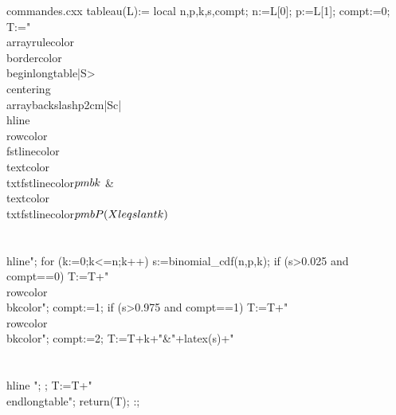 \usepackage[table]{xcolor}
\usepackage{amsmath,amssymb}
\usepackage{fancyvrb}
\usepackage{cellspace}
\setlength{\cellspacetoplimit}{3pt}
\setlength{\cellspacebottomlimit}{3pt}
\usepackage{longtable}
\def\bkcolor{gray!10}
\def\fstlinecolor{gray}
\def\txtfstlinecolor{white}
\def\bordercolor{black}

\begin{VerbatimOut}{commandes.cxx}
tableau(L):={
 local n,p,k,s,compt;
 n:=L[0];
 p:=L[1];
 compt:=0;
 T:="\\arrayrulecolor{\\bordercolor}\\begin{longtable}{|S{>{\\centering\\arraybackslash}p{2cm}}|Sc|} \\hline\\rowcolor{\\fstlinecolor}\\textcolor{\\txtfstlinecolor}{$\\pmb{k}$} & \\textcolor{\\txtfstlinecolor}{$\\pmb{P(X\\leqslant k)}$} \\\\ \\hline";
 for (k:=0;k<=n;k++)
 {
         s:=binomial_cdf(n,p,k);
         if (s>0.025 and compt==0) { T:=T+"\\rowcolor{\\bkcolor}"; compt:=1;}
         if (s>0.975 and compt==1) { T:=T+"\\rowcolor{\\bkcolor}"; compt:=2;}                T:=T+k+"&"+latex(s)+"\\\\ \\hline ";
 };
 T:=T+"\\end{longtable}";
 return(T);
}:;


\end{VerbatimOut}
